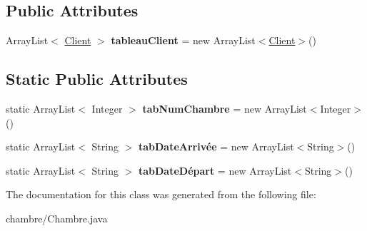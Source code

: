 \subsection*{Public Attributes}
\begin{DoxyCompactItemize}
\item 
Array\+List$<$ \hyperlink{classclient_1_1_client}{Client} $>$ {\bfseries tableau\+Client} = new Array\+List$<$\hyperlink{classclient_1_1_client}{Client}$>$()\hypertarget{classchambre_1_1_chambre_aac87080c7e7827ea70060de51438de57}{}\label{classchambre_1_1_chambre_aac87080c7e7827ea70060de51438de57}

\end{DoxyCompactItemize}
\subsection*{Static Public Attributes}
\begin{DoxyCompactItemize}
\item 
static Array\+List$<$ Integer $>$ {\bfseries tab\+Num\+Chambre} = new Array\+List$<$Integer$>$()\hypertarget{classchambre_1_1_chambre_a162ba11a048f8aab26a7c6bf761e21a2}{}\label{classchambre_1_1_chambre_a162ba11a048f8aab26a7c6bf761e21a2}

\item 
static Array\+List$<$ String $>$ {\bfseries tab\+Date\+Arrivée} = new Array\+List$<$String$>$()\hypertarget{classchambre_1_1_chambre_a9b29e09f4bc6d62664f59e99de63564d}{}\label{classchambre_1_1_chambre_a9b29e09f4bc6d62664f59e99de63564d}

\item 
static Array\+List$<$ String $>$ {\bfseries tab\+Date\+Départ} = new Array\+List$<$String$>$()\hypertarget{classchambre_1_1_chambre_ae17d710576e4b2666e6a322f7f7876b1}{}\label{classchambre_1_1_chambre_ae17d710576e4b2666e6a322f7f7876b1}

\end{DoxyCompactItemize}


The documentation for this class was generated from the following file\+:\begin{DoxyCompactItemize}
\item 
chambre/Chambre.\+java\end{DoxyCompactItemize}
